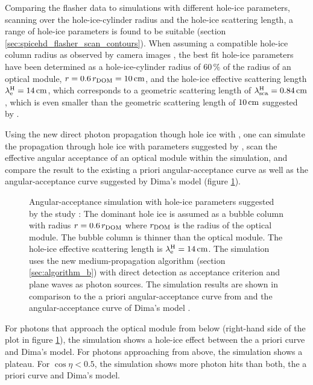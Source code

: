 Comparing the flasher data to simulations with different hole-ice
parameters, scanning over the hole-ice-cylinder radius and the hole-ice
scattering length, a range of hole-ice parameters is found to be
suitable (section \ref{sec:spicehd_flasher_scan_contours}). When
assuming a compatible hole-ice column radius as observed by camera
images \cite{rongenswedishcamera}, the best fit hole-ice parameters have
been determined as a hole-ice-cylinder radius of \(60\,\%\) of the
radius of an optical module, \(r = 0.6\,r_\text{DOM} = 10\text{\,cm}\), and the
hole-ice effective scattering length \(\lambda_\text{e}^\text{H} = 14\text{\,cm}\), which
corresponds to a geometric scattering length of
\(\lambda_\text{sca}^\text{H} = 0.84\text{\,cm}\), which is even smaller than the geometric
scattering length of \(10\text{\,cm}\) suggested by .
\cite{martinspicehddard}

Using the new direct photon propagation though hole ice with \clsim, one
can simulate the propagation through hole ice with parameters suggested
by , scan the effective angular acceptance of an optical
module within the simulation, and compare the result to the existing a
priori angular-acceptance curve \cite{icepaper} as well as the
angular-acceptance curve suggested by Dima's model
\cite{flasherdataderivedicemodels} (figure \ref{fig:ku3Zie8z}).

\begin{figure}[htbp]
  \caption{Angular-acceptance simulation with hole-ice parameters suggested by the  study \cite{martinspicehddard}: The dominant hole ice is assumed as a bubble column with radius $r = 0.6\,r_\text{DOM}$ where $r_\text{DOM}$ is the radius of the optical module. The bubble column is thinner than the optical module. The hole-ice effective scattering length is $\lambda_\text{e}^\text{H} = 14\text{\,cm}$. The simulation uses the new medium-propagation algorithm (section \ref{sec:algorithm_b}) with direct detection as acceptance criterion and plane waves as photon sources. The simulation results are shown in comparison to the a priori angular-acceptance curve from \cite{icepaper} and the angular-acceptance curve of Dima's model \cite{flasherdataderivedicemodels}.}
  \label{fig:ku3Zie8z}
\end{figure}


For photons that approach the optical module from below (right-hand side
of the plot in figure \ref{fig:ku3Zie8z}), the simulation shows a
hole-ice effect between the a priori curve and Dima's model. For photons
approaching from above, the simulation shows a plateau. For
\(\cos\eta < 0.5\), the simulation shows more photon hits than both, the
a priori curve and Dima's model.

